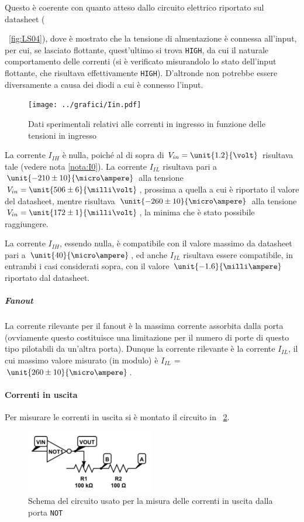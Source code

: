 \documentclass[a4paper,10pt]{article}
\def\code#1{\texttt{#1}}
\begin{document}
Questo è coerente con quanto atteso dallo circuito elettrico riportato sul datasheet (\figurename{~\ref{fig:LS04}), dove è mostrato che la tensione di almentazione è connessa all'input, per cui, se lasciato flottante, quest'ultimo si trova \code{HIGH}, da cui il naturale comportamento delle correnti (si è verificato misurandolo lo stato dell'input flottante, che risultava effettivamente \code{HIGH}). D'altronde non potrebbe essere diversamente a causa dei diodi a cui è connesso l'input.

\begin{figure}[H]
	\centering
	\texttt{[image: ../grafici/Iin.pdf]}
	\caption{Dati sperimentali relativi alle correnti in ingresso in funzione delle tensioni in ingresso}
	\label{fig:Iin}
\end{figure}

La corrente $I_{IH}$ è nulla, poiché al di sopra di $V_{in} = \unit{1.2}{\volt}$ risultava tale (vedere nota \ref{nota:I0}). La corrente $I_{IL}$ risultava pari a $\unit{-210 \pm 10}{\micro\ampere}$ alla tensione $V_{in} = \unit{506 \pm 6}{\milli\volt}$, prossima a quella a cui è riportato il valore del datasheet, mentre risultava $\unit{-260 \pm 10}{\micro\ampere}$ alla tensione $V_{in} = \unit{172 \pm 1}{\milli\volt}$, la minima che è stato possibile raggiungere.

La corrente $I_{IH}$, essendo nulla, è compatibile con il valore massimo da datasheet pari a $\unit{40}{\micro\ampere}$, ed anche $I_{IL}$ risultava essere compatibile, in entrambi i casi considerati sopra, con il valore $\unit{-1.6}{\milli\ampere}$ riportato dal datasheet.

\subparagraph{Fanout} La corrente rilevante per il fanout è la massima corrente assorbita dalla porta (ovviamente questo costituisce una limitazione per il numero di porte di questo tipo pilotabili da un'altra porta).
Dunque la corrente rilevante è la corrente $I_{IL}$, il cui massimo valore misurato (in modulo) è $I_{IL}$ = $\unit{260 \pm 10}{\micro\ampere}$.


\paragraph{Correnti in uscita} Per misurare le correnti in uscita si è montato il circuito in \figurename{~\ref{fig:NOTout}}.

\begin{figure}[H]
	\centering
	\includegraphics[width=0.5\textwidth]{../grafici/NOTout.png}
	\caption{Schema del circuito usato per la misura delle correnti in uscita dalla porta \code{NOT}}
	\label{fig:NOTout}
\end{figure}

}
\end{document}
